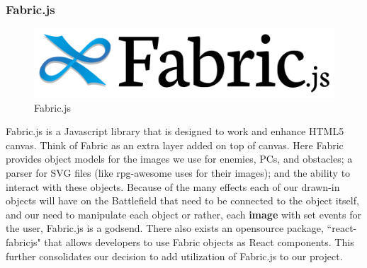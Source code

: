 \documentclass[12pt,a4paper]{report}
\begin{document}
			\subsubsection{Fabric.js}
			\begin{figure}
				\includegraphics[scale=0.15]{fabric}
				\caption{Fabric.js}
				\label{fig: Fabric.js}
			\end{figure}
			Fabric.js is a Javascript library that is designed to work and enhance HTML5 canvas. Think of Fabric as an extra layer added on top of canvas. Here Fabric provides object models for the images we use for enemies, PCs, and obstacles; a parser for SVG files (like rpg-awesome uses for their images); and the ability to interact with these objects. Because of the many effects each of our drawn-in objects will have on the Battlefield that need to be connected to the object itself, and our need to manipulate each object or rather, each \textbf{image} with set events for the user, Fabric.js is a godsend. There also exists an opensource package, ``react-fabricjs" that allows developers to use Fabric objects as React components. This further consolidates our decision to add utilization of Fabric.js to our project.
\end{document}
